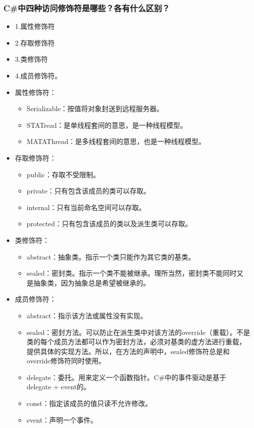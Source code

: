 \documentclass[9pt, b5paper]{article}
\begin{document}
\subsubsection{C\#中四种访问修饰符是哪些？各有什么区别？}
\label{sec:orgffbb239}
\begin{itemize}
\item 1.属性修饰符
\item 2.存取修饰符
\item 3.类修饰符
\item 4.成员修饰符。
\item 属性修饰符：
\begin{itemize}
\item Serializable：按值将对象封送到远程服务器。
\item STATread：是单线程套间的意思，是一种线程模型。
\item MATAThread：是多线程套间的意思，也是一种线程模型。
\end{itemize}
\item 存取修饰符：
\begin{itemize}
\item public：存取不受限制。
\item private：只有包含该成员的类可以存取。
\item internal：只有当前命名空间可以存取。
\item protected：只有包含该成员的类以及派生类可以存取。
\end{itemize}
\item 类修饰符：
\begin{itemize}
\item abstract：抽象类。指示一个类只能作为其它类的基类。
\item sealed：密封类。指示一个类不能被继承。理所当然，密封类不能同时又是抽象类，因为抽象总是希望被继承的。
\end{itemize}
\item 成员修饰符：
\begin{itemize}
\item abstract：指示该方法或属性没有实现。
\item sealed：密封方法。可以防止在派生类中对该方法的override（重载）。不是类的每个成员方法都可以作为密封方法，必须对基类的虚方法进行重载，提供具体的实现方法。所以，在方法的声明中，sealed修饰符总是和override修饰符同时使用。
\item delegate：委托。用来定义一个函数指针。C\#中的事件驱动是基于delegate + event的。
\item const：指定该成员的值只读不允许修改。
\item event：声明一个事件。

\end{itemize}
\end{itemize}
\end{document}
